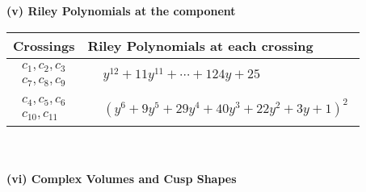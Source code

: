 \documentclass[1p]{elsarticle_modified}
\theoremstyle{definition}
\begin{document}
\newpage\renewcommand{\arraystretch}{1}
\flushleft \textbf{(v) Riley Polynomials at the component}\newline \\
\begin{tabular}{m{50pt}|m{274pt}}
Crossings & \hspace{64pt}Riley Polynomials at each crossing \\
\hline $$\begin{aligned}c_{1},c_{2},c_{3}\\c_{7},c_{8},c_{9}\end{aligned}$$&$\begin{aligned}
&y^{12}+11 y^{11}+\cdots+124 y+25
\end{aligned}$\\
\hline $$\begin{aligned}c_{4},c_{5},c_{6}\\c_{10},c_{11}\end{aligned}$$&$\begin{aligned}
&(y^6+9 y^5+29 y^4+40 y^3+22 y^2+3 y+1)^2
\end{aligned}$\\
\hline
\end{tabular}\\~\\
\newpage\flushleft \textbf{(vi) Complex Volumes and Cusp Shapes}
\end{document}
